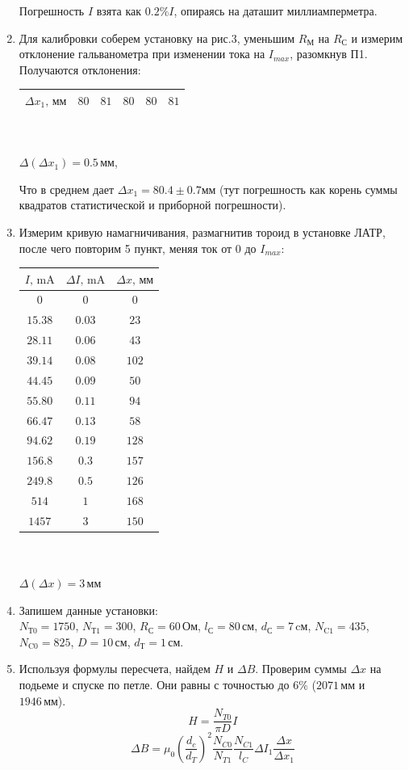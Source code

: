 \documentclass[a4paper]{article}
\begin{document}
\begin{enumerate}
Погрешность $I$ взята как $0.2\%I$, опираясь на даташит миллиамперметра.


\item
Для калибровки соберем установку на рис.3, уменьшим $R_\text{М}$ на $R_\text{С}$ и измерим отклонение гальванометра при изменении тока на $I_{max}$, разомкнув П1.
Получаются отклонения:
\begin{center}
\begin{tabular}{|c|c|c|c|c|c|}\hline
$\Delta x_1,\,\text{мм}$&$80$&$81$&$80$&$80$&$81$\\\hline
\end{tabular}\\~\\
$\Delta (\Delta x_1) = 0.5\,\text{мм}$,
\end{center}
Что в среднем дает $\Delta x_1=80.4\pm0.7\text{мм}$ (тут погрешность как корень суммы квадратов статистической и приборной погрешности).

\newpage
\item
Измерим кривую намагничивания, размагнитив тороид в установке ЛАТР, после чего повторим 5 пункт, меняя ток от $0$ до $I_{max}$:

\begin{center}
\begin{tabular}{|c|c|c|}\hline
$I\text{, mA}$&$\Delta I\text{, mA}$&$\Delta x\text{, мм}$\\\hline
$0$&$0$&$0$\\\hline
$15.38$&$0.03$&$23$\\\hline
$28.11$&$0.06$&$43$\\\hline
$39.14$&$0.08$&$102$\\\hline
$44.45$&$0.09$&$50$\\\hline
$55.80$&$0.11$&$94$\\\hline
$66.47$&$0.13$&$58$\\\hline
$94.62$&$0.19$&$128$\\\hline
$156.8$&$0.3$&$157$\\\hline
$249.8$&$0.5$&$126$\\\hline
$514$&$1$&$168$\\\hline
$1457$&$3$&$150$\\\hline
\end{tabular}\\~\\
$\Delta (\Delta x)=3\,\text{мм}$
\end{center}

\item
Запишем данные установки:\\
$N_\text{Т0}=1750$, $N_\text{Т1}=300$, $R_\text{С}=60\,\text{Ом}$, $l_\text{С}=80\,\text{см}$, $d_\text{С}=7\,\text{cм}$, $N_\text{C1}=435$, $N_\text{C0}=825$, $D=10\,\text{см}$, $d_\text{Т}=1\,\text{см}$.
\item
Используя формулы пересчета, найдем $H$ и $\Delta B$.
Проверим суммы $\Delta x$ на подьеме и спуске по петле. Они равны с точностью до $6\%$ ($2071\,\text{мм}$ и $1946\,\text{мм}$).
$$H=\frac{N_{T0}}{\pi D}I$$
$$\Delta B = \mu_0 \left(\frac{d_c}{d_T}\right)^2\frac{N_{C0}}{N_{T1}}\frac{N_{C1}}{l_C}\Delta I_1 \frac{\Delta x}{\Delta x_1}$$


\end{enumerate}
\end{document}
